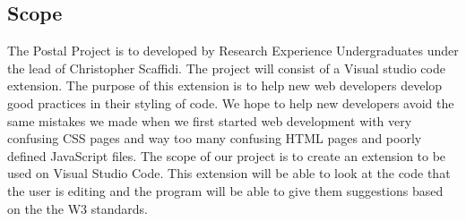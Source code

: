 \documentclass[letterpaper,10pt,titlepage,draftclsnofoot,onecolumn,onesided] {IEEEtran}
\begin{document}
\subsection{Scope}
The Postal Project is to developed by Research Experience Undergraduates under the lead of Christopher Scaffidi. 
The project will consist of a Visual studio code extension.
The purpose of this extension is to help new web developers develop good practices in their styling of code.
We hope to help new developers avoid the same mistakes we made when we first started web development with very confusing CSS pages and way too many confusing HTML pages and poorly defined JavaScript files.
The scope of our project is to create an extension to be used on Visual Studio Code. 
This extension will be able to look at the code that the user is editing and the program will be able to give them suggestions based on the the W3 standards. 
\end{document}
